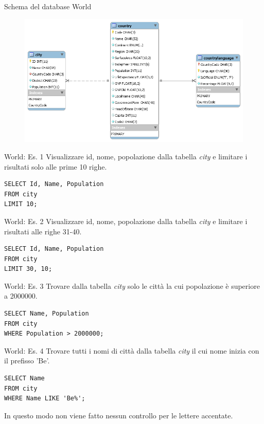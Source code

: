 \begin{frame}[fragile]{Schema del database World}
\begin{figure}
    \centering
        \includegraphics[width=.8\textwidth]{img/db-world.png}
    \end{figure}
\end{frame}
%
\begin{frame}[fragile]{World: Es. 1}
Visualizzare id, nome, popolazione dalla tabella \textit{city} e limitare i risultati solo alle prime 10 righe.
\pause
\begin{lstlisting}
SELECT Id, Name, Population
FROM city
LIMIT 10;
\end{lstlisting}
\end{frame}
%
\begin{frame}[fragile]{World: Es. 2}
Visualizzare id, nome, popolazione dalla tabella \textit{city} e limitare i risultati alle righe 31-40.
\pause
\begin{lstlisting}
SELECT Id, Name, Population
FROM city
LIMIT 30, 10;
\end{lstlisting}
\end{frame}
%
\begin{frame}[fragile]{World: Es. 3}
Trovare dalla tabella \textit{city} solo le citt\`a la cui popolazione \`e superiore a 2000000.
\pause
\begin{lstlisting}
SELECT Name, Population
FROM city
WHERE Population > 2000000;
\end{lstlisting}
\end{frame}

%
\begin{frame}[fragile]{World: Es. 4}
Trovare tutti i nomi di citt\`a dalla tabella \textit{city} il cui nome inizia con il prefisso 'Be'.
\pause
\begin{lstlisting}
SELECT Name
FROM city
WHERE Name LIKE 'Be%';
\end{lstlisting}
In questo modo non viene fatto nessun controllo per le lettere accentate.
\end{frame}

